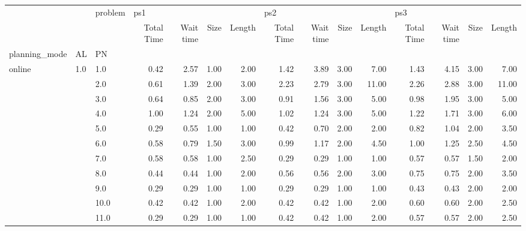 \begin{tabular}{lllrrrrrrrrrrrr}
\toprule
       &     & problem & \multicolumn{4}{l}{ps1} & \multicolumn{4}{l}{ps2} & \multicolumn{4}{l}{ps3} \\
       &     & {} & Total Time & Wait time & Size & Length & Total Time & Wait time & Size & Length & Total Time & Wait time & Size & Length \\
planning\_mode & AL & PN &            &           &      &        &            &           &      &        &            &           &      &        \\
\midrule
online & 1.0 & 1.0  &       0.42 &      2.57 & 1.00 &   2.00 &       1.42 &      3.89 & 3.00 &   7.00 &       1.43 &      4.15 & 3.00 &   7.00 \\
       &     & 2.0  &       0.61 &      1.39 & 2.00 &   3.00 &       2.23 &      2.79 & 3.00 &  11.00 &       2.26 &      2.88 & 3.00 &  11.00 \\
       &     & 3.0  &       0.64 &      0.85 & 2.00 &   3.00 &       0.91 &      1.56 & 3.00 &   5.00 &       0.98 &      1.95 & 3.00 &   5.00 \\
       &     & 4.0  &       1.00 &      1.24 & 2.00 &   5.00 &       1.02 &      1.24 & 3.00 &   5.00 &       1.22 &      1.71 & 3.00 &   6.00 \\
       &     & 5.0  &       0.29 &      0.55 & 1.00 &   1.00 &       0.42 &      0.70 & 2.00 &   2.00 &       0.82 &      1.04 & 2.00 &   3.50 \\
       &     & 6.0  &       0.58 &      0.79 & 1.50 &   3.00 &       0.99 &      1.17 & 2.00 &   4.50 &       1.00 &      1.25 & 2.50 &   4.50 \\
       &     & 7.0  &       0.58 &      0.58 & 1.00 &   2.50 &       0.29 &      0.29 & 1.00 &   1.00 &       0.57 &      0.57 & 1.50 &   2.00 \\
       &     & 8.0  &       0.44 &      0.44 & 1.00 &   2.00 &       0.56 &      0.56 & 2.00 &   3.00 &       0.75 &      0.75 & 2.00 &   3.50 \\
       &     & 9.0  &       0.29 &      0.29 & 1.00 &   1.00 &       0.29 &      0.29 & 1.00 &   1.00 &       0.43 &      0.43 & 2.00 &   2.00 \\
       &     & 10.0 &       0.42 &      0.42 & 1.00 &   2.00 &       0.42 &      0.42 & 1.00 &   2.00 &       0.60 &      0.60 & 2.00 &   2.50 \\
       &     & 11.0 &       0.29 &      0.29 & 1.00 &   1.00 &       0.42 &      0.42 & 1.00 &   2.00 &       0.57 &      0.57 & 2.00 &   2.50 \\

\end{tabular}
